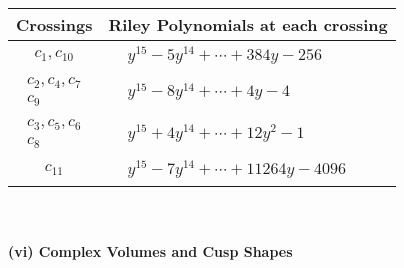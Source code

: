 \documentclass[1p]{elsarticle_modified}
\theoremstyle{definition}
\begin{document}
\begin{tabular}{m{50pt}|m{274pt}}
Crossings & \hspace{64pt}Riley Polynomials at each crossing \\
\hline $$\begin{aligned}c_{1},c_{10}\end{aligned}$$&$\begin{aligned}
&y^{15}-5 y^{14}+\cdots+384 y-256
\end{aligned}$\\
\hline $$\begin{aligned}c_{2},c_{4},c_{7}\\c_{9}\end{aligned}$$&$\begin{aligned}
&y^{15}-8 y^{14}+\cdots+4 y-4
\end{aligned}$\\
\hline $$\begin{aligned}c_{3},c_{5},c_{6}\\c_{8}\end{aligned}$$&$\begin{aligned}
&y^{15}+4 y^{14}+\cdots+12 y^2-1
\end{aligned}$\\
\hline $$\begin{aligned}c_{11}\end{aligned}$$&$\begin{aligned}
&y^{15}-7 y^{14}+\cdots+11264 y-4096
\end{aligned}$\\
\hline
\end{tabular}\\~\\
\newpage\flushleft \textbf{(vi) Complex Volumes and Cusp Shapes}
\end{document}
